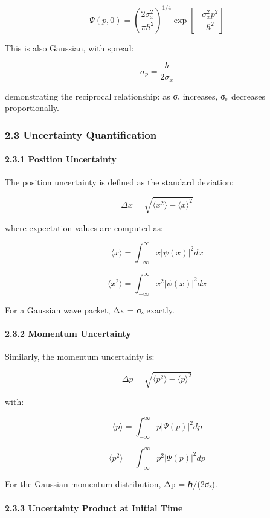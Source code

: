 \documentclass[
]{article}
\begin{document}
\[\Psi(p,0) = \left(\frac{2\sigma_x^2}{\pi\hbar^2}\right)^{1/4} \exp\left[-\frac{\sigma_x^2 p^2}{\hbar^2}\right]\]

This is also Gaussian, with spread:

\[\sigma_p = \frac{\hbar}{2\sigma_x}\]

demonstrating the reciprocal relationship: as σₓ increases, σₚ decreases
proportionally.

\subsubsection{2.3 Uncertainty
Quantification}\label{uncertainty-quantification}

\paragraph{2.3.1 Position Uncertainty}\label{position-uncertainty}

The position uncertainty is defined as the standard deviation:

\[\Delta x = \sqrt{\langle x^2 \rangle - \langle x \rangle^2}\]

where expectation values are computed as:

\[\langle x \rangle = \int_{-\infty}^{\infty} x|\psi(x)|^2 dx\]

\[\langle x^2 \rangle = \int_{-\infty}^{\infty} x^2|\psi(x)|^2 dx\]

For a Gaussian wave packet, Δx = σₓ exactly.

\paragraph{2.3.2 Momentum Uncertainty}\label{momentum-uncertainty}

Similarly, the momentum uncertainty is:

\[\Delta p = \sqrt{\langle p^2 \rangle - \langle p \rangle^2}\]

with:

\[\langle p \rangle = \int_{-\infty}^{\infty} p|\Psi(p)|^2 dp\]

\[\langle p^2 \rangle = \int_{-\infty}^{\infty} p^2|\Psi(p)|^2 dp\]

For the Gaussian momentum distribution, Δp = ℏ/(2σₓ).

\paragraph{2.3.3 Uncertainty Product at Initial
Time}\label{uncertainty-product-at-initial-time}
\end{document}
